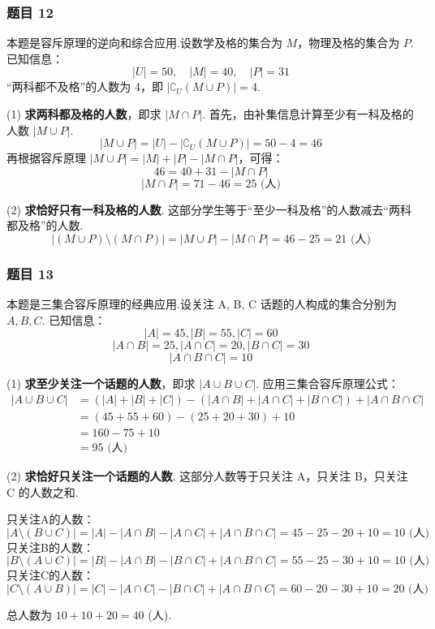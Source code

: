 \subsubsection*{题目 12}
\begin{solution}
	本题是容斥原理的逆向和综合应用.设数学及格的集合为 $M$，物理及格的集合为 $P$.
	已知信息：
	\[ |U|=50, \quad |M|=40, \quad |P|=31 \]
	“两科都不及格”的人数为 4，即 $|\complement_U(M \cup P)|=4$.
	
	(1) \textbf{求两科都及格的人数}，即求 $|M \cap P|$.
	首先，由补集信息计算至少有一科及格的人数 $|M \cup P|$.
	\[ |M \cup P| = |U| - |\complement_U(M \cup P)| = 50 - 4 = 46 \]
	再根据容斥原理 $|M \cup P| = |M| + |P| - |M \cap P|$，可得：
	\[ 46 = 40 + 31 - |M \cap P| \]
	\[ |M \cap P| = 71 - 46 = 25 \text{ (人)} \]
	
	(2) \textbf{求恰好只有一科及格的人数}.
	这部分学生等于“至少一科及格”的人数减去“两科都及格”的人数.
	\[ |(M \cup P) \setminus (M \cap P)| = |M \cup P| - |M \cap P| = 46 - 25 = 21 \text{ (人)} \]
\end{solution}

\subsubsection*{题目 13}
\begin{solution}
	本题是三集合容斥原理的经典应用.设关注 A, B, C 话题的人构成的集合分别为 $A, B, C$.
	已知信息：
	\[ |A|=45, |B|=55, |C|=60 \]
	\[ |A \cap B|=25, |A \cap C|=20, |B \cap C|=30 \]
	\[ |A \cap B \cap C|=10 \]
	
	(1) \textbf{求至少关注一个话题的人数}，即求 $|A \cup B \cup C|$.
	应用三集合容斥原理公式：
	\begin{align*}
		|A \cup B \cup C| &= (|A|+|B|+|C|) - (|A \cap B|+|A \cap C|+|B \cap C|) + |A \cap B \cap C| \\
		&= (45+55+60) - (25+20+30) + 10 \\
		&= 160 - 75 + 10 \\
		&= 95 \text{ (人)}
	\end{align*}
	
	(2) \textbf{求恰好只关注一个话题的人数}.
	这部分人数等于只关注 A，只关注 B，只关注 C 的人数之和.
	
	只关注A的人数：
	\[ |A \setminus (B \cup C)| = |A| - |A \cap B| - |A \cap C| + |A \cap B \cap C| = 45 - 25 - 20 + 10 = 10 \text{ (人)} \]
	只关注B的人数：
	\[ |B \setminus (A \cup C)| = |B| - |A \cap B| - |B \cap C| + |A \cap B \cap C| = 55 - 25 - 30 + 10 = 10 \text{ (人)} \]
	只关注C的人数：
	\[ |C \setminus (A \cup B)| = |C| - |A \cap C| - |B \cap C| + |A \cap B \cap C| = 60 - 20 - 30 + 10 = 20 \text{ (人)} \]
	
	总人数为 $10 + 10 + 20 = 40$ (人).
\end{solution}